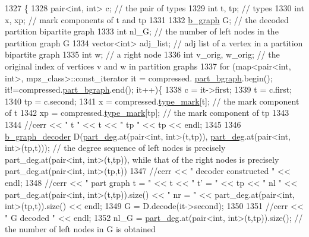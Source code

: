 \begin{DoxyCode}
1327 \{
1328   pair<int, int> c; \textcolor{comment}{// the pair of types}
1329   \textcolor{keywordtype}{int} t, tp; \textcolor{comment}{// types}
1330   \textcolor{keywordtype}{int} x, xp; \textcolor{comment}{// mark components of t and tp}
1331 
1332   \hyperlink{classb__graph}{b\_graph} G; \textcolor{comment}{// the decoded partition bipartite graph}
1333   \textcolor{keywordtype}{int} nl\_G; \textcolor{comment}{// the number of left nodes in the partition graph G }
1334   vector<int> adj\_list; \textcolor{comment}{// adj list of a vertex in a partition bipartite graph}
1335   \textcolor{keywordtype}{int} w; \textcolor{comment}{// a right node}
1336   \textcolor{keywordtype}{int} v\_orig, w\_orig; \textcolor{comment}{// the original index of vertices v and w in partition graphs }
1337   \textcolor{keywordflow}{for} (map<pair<int, int>, mpz\_class>::const\_iterator it = compressed.
      \hyperlink{classmarked__graph__compressed_a7b3267063fba30b45eb21b3ba4e07536}{part\_bgraph}.begin(); it!=compressed.\hyperlink{classmarked__graph__compressed_a7b3267063fba30b45eb21b3ba4e07536}{part\_bgraph}.end(); it++)\{
1338     c = it->first;
1339     t = c.first;
1340     tp = c.second;
1341     x = compressed.\hyperlink{classmarked__graph__compressed_a86b00223525703e973415cbc9c94da68}{type\_mark}[t]; \textcolor{comment}{// the mark component of t}
1342     xp = compressed.\hyperlink{classmarked__graph__compressed_a86b00223525703e973415cbc9c94da68}{type\_mark}[tp]; \textcolor{comment}{// the mark component of tp }
1343 
1344     \textcolor{comment}{//cerr << " t " << t << " tp " << tp << endl;}
1345 
1346     \hyperlink{classb__graph__decoder}{b\_graph\_decoder} D(\hyperlink{classmarked__graph__decoder_a6882e96fcad9abb10e72f1398814824a}{part\_deg}.at(pair<int, int>(t,tp)), 
      \hyperlink{classmarked__graph__decoder_a6882e96fcad9abb10e72f1398814824a}{part\_deg}.at(pair<int, int>(tp,t))); \textcolor{comment}{// the degree sequence of left nodes is precisely
       part\_deg.at(pair<int, int>(t,tp)), while that of the right nodes is precisely part\_deg.at(pair<int, int>(tp,t))}
1347     \textcolor{comment}{//cerr << " decoder constructed " << endl;}
1348     \textcolor{comment}{//cerr << " part graph t = "  << t << " t' = " << tp << " nl " << part\_deg.at(pair<int,
       int>(t,tp)).size() << " nr = " << part\_deg.at(pair<int, int>(tp,t)).size() << endl;}
1349     G = D.decode(it->second);
1350 
1351     \textcolor{comment}{//cerr << " G decoded " << endl;}
1352     nl\_G = \hyperlink{classmarked__graph__decoder_a6882e96fcad9abb10e72f1398814824a}{part\_deg}.at(pair<int, int>(t,tp)).size(); \textcolor{comment}{// the number of left nodes in G is obtained
}
\end{DoxyCode}
